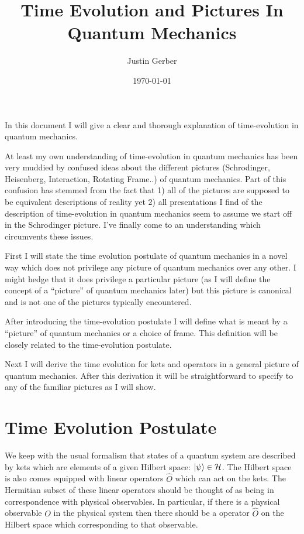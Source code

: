 \documentclass[12pt]{article}
\begin{document}
\title{Time Evolution and Pictures In Quantum Mechanics}
\author{Justin Gerber}
\date{\today}
\maketitle

In this document I will give a clear and thorough explanation of time-evolution in quantum mechanics. 

At least my own understanding of time-evolution in quantum mechanics has been very muddied by confused ideas about the different pictures (Schrodinger, Heisenberg, Interaction, Rotating Frame..) of quantum mechanics. Part of this confusion has stemmed from the fact that 1) all of the pictures are supposed to be equivalent descriptions of reality yet 2) all presentations I find of the description of time-evolution in quantum mechanics seem to assume we start off in the Schrodinger picture. I've finally come to an understanding which circumvents these issues.

First I will state the time evolution postulate of quantum mechanics in a novel way which does not privilege any picture of quantum mechanics over any other. I might hedge that it does privilege a particular picture (as I will define the concept of a ``picture'' of quantum mechanics later) but this picture is canonical and is not one of the pictures typically encountered.

After introducing the time-evolution postulate I will define what is meant by a ``picture'' of quantum mechanics or a choice of frame. This definition will be closely related to the time-evolution postulate.

Next I will derive the time evolution for kets and operators in a general picture of quantum mechanics. After this derivation it will be straightforward to specify to any of the familiar pictures as I will show.

\section{Time Evolution Postulate}

We keep with the usual formalism that states of a quantum system are described by kets which are elements of a given Hilbert space: $\ket{\psi} \in \mathcal{H}$. The Hilbert space is also comes equipped with linear operators $\hat{O}$ which can act on the kets. The Hermitian subset of these linear operators should be thought of as being in correspondence with physical observables. In particular, if there is a physical observable $O$ in the physical system then there should be a operator $\hat{O}$ on the Hilbert space which corresponding to that observable.
\end{document}
